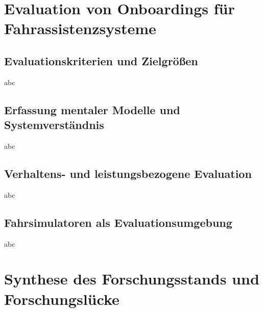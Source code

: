 \section{Evaluation von Onboardings für Fahrassistenzsysteme}
\label{sec:evaluation_onboarding}

\subsection{Evaluationskriterien und Zielgrößen}
\label{subsec:evaluationskriterien}
abc

\subsection{Erfassung mentaler Modelle und Systemverständnis}
\label{subsec:messung_mentale_modelle}
abc

\subsection{Verhaltens- und leistungsbezogene Evaluation}
\label{subsec:verhaltensmessung}
abc

\subsection{Fahrsimulatoren als Evaluationsumgebung}
\label{subsec:fahrsimulator}
abc


\section{Synthese des Forschungsstands und Forschungslücke}
\label{sec:synthese_forschungsluecke}